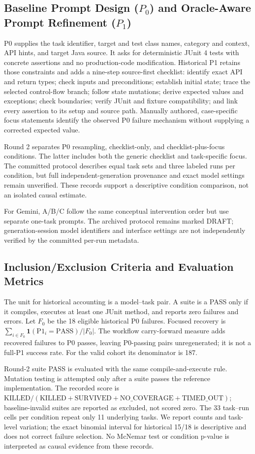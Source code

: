 \subsection{Baseline Prompt Design ($P_0$) and Oracle-Aware Prompt Refinement ($P_1$)}
\label{subsec:prompt_design}
P0 supplies the task identifier, target and test class names, category and context, API hints, and target Java source. It asks for deterministic JUnit 4 tests with concrete assertions and no production-code modification. Historical P1 retains those constraints and adds a nine-step source-first checklist: identify exact API and return types; check inputs and preconditions; establish initial state; trace the selected control-flow branch; follow state mutations; derive expected values and exceptions; check boundaries; verify JUnit and fixture compatibility; and link every assertion to its setup and source path. Manually authored, case-specific focus statements identify the observed P0 failure mechanism without supplying a corrected expected value.

Round 2 separates P0 resampling, checklist-only, and checklist-plus-focus conditions. The latter includes both the generic checklist and task-specific focus. The committed protocol describes equal task sets and three labeled runs per condition, but full independent-generation provenance and exact model settings remain unverified. These records support a descriptive condition comparison, not an isolated causal estimate.

For Gemini, A/B/C follow the same conceptual intervention order but use separate one-task prompts. The archived protocol remains marked DRAFT; generation-session model identifiers and interface settings are not independently verified by the committed per-run metadata.

\subsection{Inclusion/Exclusion Criteria and Evaluation Metrics}
\label{subsec:metrics}
The unit for historical accounting is a model--task pair. A suite is a PASS only if it compiles, executes at least one JUnit method, and reports zero failures and errors. Let $F_0$ be the 18 eligible historical P0 failures. Focused recovery is $\sum_{i\in F_0}\mathbf{1}(\mathrm{P1}_i=\mathrm{PASS})/|F_0|$. The workflow carry-forward measure adds recovered failures to P0 passes, leaving P0-passing pairs unregenerated; it is not a full-P1 success rate. For the valid cohort its denominator is 187.

Round-2 suite PASS is evaluated with the same compile-and-execute rule. Mutation testing is attempted only after a suite passes the reference implementation. The recorded score is $\mathrm{KILLED}/(\mathrm{KILLED}+\mathrm{SURVIVED}+\mathrm{NO\_COVERAGE}+\mathrm{TIMED\_OUT})$; baseline-invalid suites are reported as excluded, not scored zero. The 33 task--run cells per condition repeat only 11 underlying tasks. We report counts and task-level variation; the exact binomial interval for historical 15/18 is descriptive and does not correct failure selection. No McNemar test or condition p-value is interpreted as causal evidence from these records.
